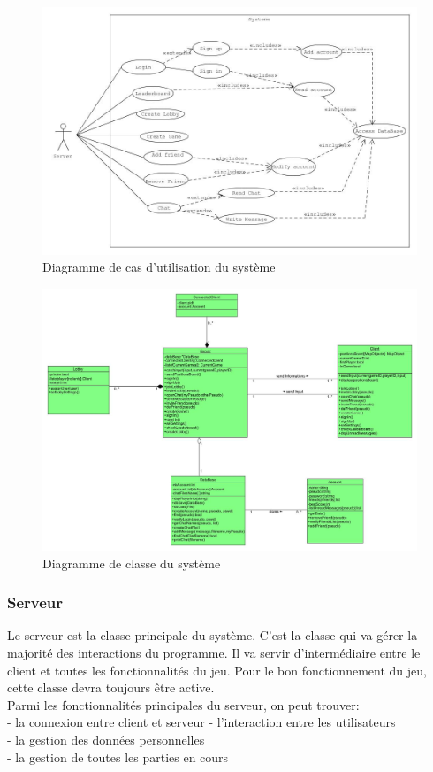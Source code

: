 \documentclass[a4paper,12pt]{article}
\begin{document}
\begin{figure}[h!]
\centering
\includegraphics[width=16cm]{NEWSystemUseCase.jpg}
\caption{Diagramme de cas d'utilisation du système}
\label{fig:UerUseCase}
\end{figure}

\begin{figure}[h!]
\centering
\includegraphics[width=16cm]{newSystemClassDiagram.jpg}
\caption{Diagramme de classe du système}
\label{fig:UerUseCase}
\end{figure}

\subsubsection{Serveur}
Le serveur est la classe principale du système. C'est la classe qui va gérer la majorité des interactions du programme. Il va servir d'intermédiaire entre le client et toutes les fonctionnalités du jeu. Pour le bon fonctionnement du jeu, cette classe devra toujours être active.\\
Parmi les fonctionnalités principales du serveur, on peut trouver:\\
- la connexion entre client et serveur
- l'interaction entre les utilisateurs\\
- la gestion des données personnelles\\
- la gestion de toutes les parties en cours
\end{document}
